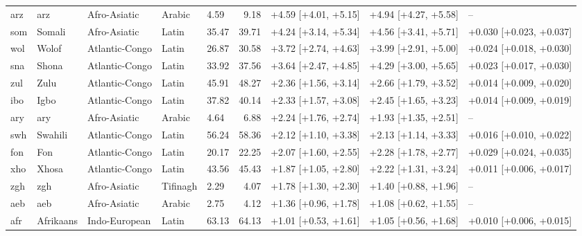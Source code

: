 {\begin{longtable}{@{}lllllrlll@{}}
arz & arz & Afro-Asiatic & Arabic & 4.59 & 9.18 & +4.59 [+4.01, +5.15] & +4.94 [+4.27, +5.58] & -- \\
som & Somali & Afro-Asiatic & Latin & 35.47 & 39.71 & +4.24 [+3.14, +5.34] & +4.56 [+3.41, +5.71] & +0.030 [+0.023, +0.037] \\
wol & Wolof & Atlantic-Congo & Latin & 26.87 & 30.58 & +3.72 [+2.74, +4.63] & +3.99 [+2.91, +5.00] & +0.024 [+0.018, +0.030] \\
sna & Shona & Atlantic-Congo & Latin & 33.92 & 37.56 & +3.64 [+2.47, +4.85] & +4.29 [+3.00, +5.65] & +0.023 [+0.017, +0.030] \\
zul & Zulu & Atlantic-Congo & Latin & 45.91 & 48.27 & +2.36 [+1.56, +3.14] & +2.66 [+1.79, +3.52] & +0.014 [+0.009, +0.020] \\
ibo & Igbo & Atlantic-Congo & Latin & 37.82 & 40.14 & +2.33 [+1.57, +3.08] & +2.45 [+1.65, +3.23] & +0.014 [+0.009, +0.019] \\
ary & ary & Afro-Asiatic & Arabic & 4.64 & 6.88 & +2.24 [+1.76, +2.74] & +1.93 [+1.35, +2.51] & -- \\
swh & Swahili & Atlantic-Congo & Latin & 56.24 & 58.36 & +2.12 [+1.10, +3.38] & +2.13 [+1.14, +3.33] & +0.016 [+0.010, +0.022] \\
fon & Fon & Atlantic-Congo & Latin & 20.17 & 22.25 & +2.07 [+1.60, +2.55] & +2.28 [+1.78, +2.77] & +0.029 [+0.024, +0.035] \\
xho & Xhosa & Atlantic-Congo & Latin & 43.56 & 45.43 & +1.87 [+1.05, +2.80] & +2.22 [+1.31, +3.24] & +0.011 [+0.006, +0.017] \\
zgh & zgh & Afro-Asiatic & Tifinagh & 2.29 & 4.07 & +1.78 [+1.30, +2.30] & +1.40 [+0.88, +1.96] & -- \\
aeb & aeb & Afro-Asiatic & Arabic & 2.75 & 4.12 & +1.36 [+0.96, +1.78] & +1.08 [+0.62, +1.55] & -- \\
afr & Afrikaans & Indo-European & Latin & 63.13 & 64.13 & +1.01 [+0.53, +1.61] & +1.05 [+0.56, +1.68] & +0.010 [+0.006, +0.015] \\
\end{longtable}}
